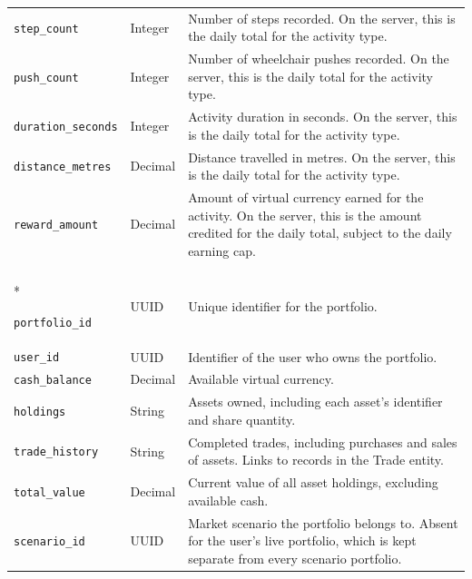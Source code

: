 \documentclass[12pt]{article}
\begin{document}
\begin{longtable}{
    @{}p{}
    p{}
    p{}@{}
}
\texttt{step\_count} & Integer &
Number of steps recorded. On the server, this is the daily
total for the activity type.\\

\texttt{push\_count} & Integer &
Number of wheelchair pushes recorded. On the server, this is the
daily total for the activity type.\\

\texttt{duration\_seconds} & Integer &
Activity duration in seconds. On the server, this is the daily
total for the activity type.\\

\texttt{distance\_metres} & Decimal &
Distance travelled in metres. On the server, this is the daily
total for the activity type.\\

\texttt{reward\_amount} & Decimal &
Amount of virtual currency earned for the activity.
On the server, this is the amount credited for the daily total,
subject to the daily earning cap.\\

\addlinespace


\multicolumn{3}{@{}l}{\textbf{Portfolio --- Phone and server}}\\*
\midrule

\texttt{portfolio\_id} & UUID &
Unique identifier for the portfolio.\\

\texttt{user\_id} & UUID &
Identifier of the user who owns the portfolio.\\

\texttt{cash\_balance} & Decimal &
Available virtual currency.\\

\texttt{holdings} & String &
Assets owned, including each asset's identifier and share quantity.\\

\texttt{trade\_history} & String &
Completed trades, including purchases and sales of assets.
Links to records in the Trade entity.\\

\texttt{total\_value} & Decimal &
Current value of all asset holdings, excluding available cash.\\

\texttt{scenario\_id} & UUID &
Market scenario the portfolio belongs to. Absent for the user's live
portfolio, which is kept separate from every scenario portfolio.\\


\end{longtable}
\end{document}
